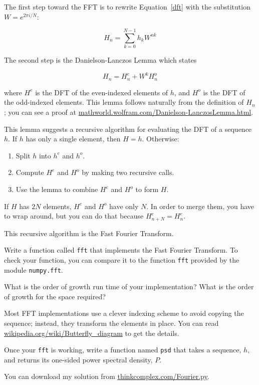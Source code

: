 \documentclass[10pt]{book}
\begin{document}
The first step toward the FFT is to rewrite Equation~\ref{dft}
with the substitution $W = e^{2 \pi i/N}$:

\begin{equation}
H_n = \sum_{k=0}^{N-1} h_k W^{n k}
\end{equation}

The second step is the Danielson-Lanczos Lemma which states

\[ H_n = H^e_n + W^k H^o_n \]

where $H^e$ is the DFT of the even-indexed elements
of $h$, and $H^o$ is the DFT of the odd-indexed elements.
This lemma follows naturally from the definition of $H_n$; you can see
a proof at \url{mathworld.wolfram.com/Danielson-LanczosLemma.html}.

This lemma suggests a recursive algorithm for evaluating the DFT
of a sequence $h$.  If  $h$ has only a single element, then $H=h$.
Otherwise:

\begin{enumerate}

\item Split $h$ into $h^e$ and $h^o$.

\item Compute $H^e$ and $H^o$ by making two recursive calls.

\item Use the lemma to combine $H^e$ and $H^o$ to form $H$.

\end{enumerate}

If $H$ has $2N$ elements, $H^e$ and $H^o$ have only $N$.
In order to merge them, you have to wrap around, but you
can do that because $H^e_{n+N} = H^e_{n}$.

This recursive algorithm is the Fast Fourier Transform.

\begin{exercise}

Write a function called {\tt fft} that implements
the Fast Fourier Transform.  To check your function, you
can compare it to the function {\tt fft} provided by
the module {\tt numpy.fft}.

What is the order of growth run time of your implementation?
What is the order of growth for the space required?

Most FFT implementations use a clever indexing scheme to avoid copying
the sequence; instead, they transform the elements in place.  You can
read \url{wikipedia.org/wiki/Butterfly_diagram} to get the details.

Once your {\tt fft} is working, write a function named
{\tt psd} that takes a sequence, $h$, and returns its
one-sided power spectral density, $P$.

You can download my solution from \url{thinkcomplex.com/Fourier.py}.

\end{exercise}
\end{document}
